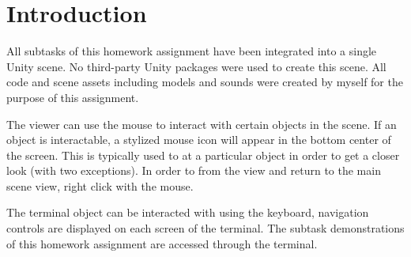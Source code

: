 \documentclass[11pt]{article}
\begin{document}
\maketitle

\section*{Introduction}
All subtasks of this homework assignment have been integrated into a single Unity scene. No third-party Unity packages were used to create this scene. All code and scene assets including models and sounds were created by myself for the purpose of this assignment.

The viewer can use the mouse to interact with certain objects in the scene. If an object is interactable, a stylized mouse icon will appear in the bottom center of the screen. This is typically used to  at a particular object in order to get a closer look (with two exceptions). In order to  from the  view and return to the main scene view, right click with the mouse.

The terminal object can be interacted with using the keyboard, navigation controls are displayed on each screen of the terminal. The subtask demonstrations of this homework assignment are accessed through the terminal.
\end{document}
